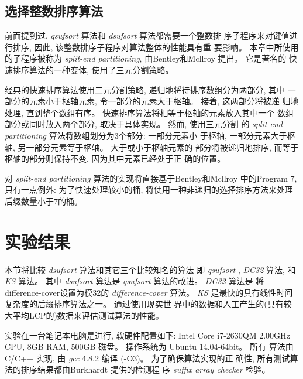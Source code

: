 \subsection{选择整数排序算法}

前面提到过, \emph{qsufsort} 算法和 \emph{dsufsort} 算法都需要一个整数排
序子程序来对键值进行排序, 因此, 该整数排序子程序对算法整体的性能具有重
要影响。 本章中所使用的子程序被称为 \emph{split-end
  partitioning}, 由Bentley和Mcllroy\cite{Bentley1993} 提出。 它是著名的
快速排序算法\cite{Hoare1962}的一种变体, 使用了三元分割策略。

经典的快速排序算法使用二元分割策略, 递归地将待排序数组分为两部分, 其中
一部分的元素小于枢轴元素, 令一部分的元素大于枢轴。 接着, 这两部分将被递
归地处理, 直到整个数组有序。 快速排序算法将相等于枢轴的元素放入其中一个
数组部分或同时放入两个部分, 取决于具体实现。 然而, 使用三元分割
的 \emph{split-end partitioning} 算法将数组划分为3个部分: 一部分元素小
于枢轴, 一部分元素大于枢轴, 另一部分元素等于枢轴。 大于或小于枢轴元素的
部分将被递归地排序, 而等于枢轴的部分则保持不变, 因为其中元素已经处于正
确的位置。

对 \emph{split-end partitioning} 算法的实现将直接基于Bentley和Mcllroy
\cite{Bentley1993} 中的Program 7, 只有一点例外: 为了快速处理较小的桶,
将使用一种非递归的选择排序方法来处理后缀数量小于7的桶。

\section{实验结果}

本节将比较 \emph{dsufsort} 算法和其它三个比较知名的算法
即 \emph{qsufsort} \cite{Larsson2007},
\emph{DC32}\cite{Burkhardt2003} 算法, 和 \emph{KS} 算法\cite{Karkkainen2006}。 其中
\emph{dsufsort} 算法是 \emph{qsufsort} 算法的改进。 \emph{DC32} 算法是
将 difference-cover设置为模32的 \emph{difference-cover} 算法。
\emph{KS} 是最快的具有线性时间复杂度的后缀排序算法之一。 通过使用现实世
界中的数据和人工产生的(具有较大平均LCP的)数据来评估测试算法的性能。

实验在一台笔记本电脑是进行, 软硬件配置如下: Intel Core i7-2630QM
2.00GHz CPU, 8GB RAM, 500GB 磁盘。 操作系统为 Ubuntu 14.04-64bit。  所有
算法由 C/C++ 实现, 由 \emph{gcc} 4.8.2 编译 (-O3)。 为了确保算法实现的正
确性, 所有测试算法的排序结果都由Burkhardt \cite{Burkhardt2003} 提供的检测程
序 \emph{suffix array checker} 检验。

